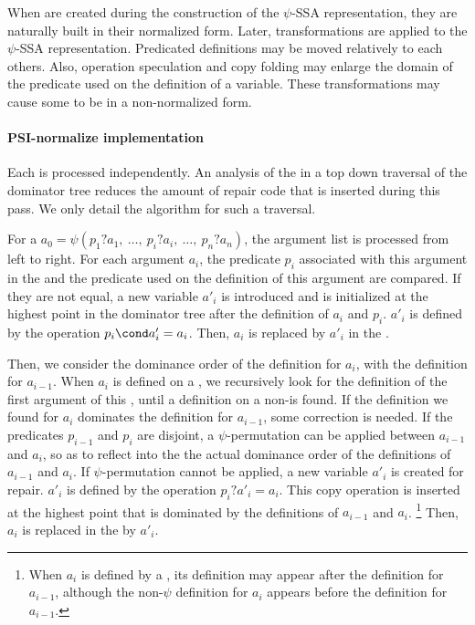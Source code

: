 When \psifuns
are created during the construction of the $\psi$-SSA representation,
they are naturally built in their normalized form. Later, 
transformations are applied to the $\psi$-SSA representation.
Predicated definitions may be moved relatively to each others. Also,
operation speculation and copy folding may enlarge the domain of the
predicate used on the definition of a variable. These transformations
may cause some \psifuns to be in a non-normalized form.




\paragraph{PSI-normalize implementation}

Each \psifun is processed independently. An analysis of the
\psifuns in a top down traversal of the dominator tree
reduces the amount of repair code that is inserted during this pass. We
only detail the algorithm for such a traversal.

For a \psifun ${a_0 = \psi(p_1?a_1,\ \dots,\ p_i?a_i,\ \dots,\
  p_n?a_n)}$, the argument list is processed from left to right. For
each argument ${a_i}$, the predicate ${p_i}$ associated with this argument
in the \psifun and the predicate used on the definition of
this argument are compared. If they are not equal, a new variable
${a'_i}$ is introduced and is initialized at the highest point in the
dominator tree after the definition of ${a_i}$ and ${p_i}$. ${a'_i}$ is
defined by the operation ${p_i\cond a'_i = a_i}$. Then, ${a_i}$ is
replaced by ${a'_i}$ in the \psifun.

Then, we consider the dominance order of the definition for ${a_i}$,
with the definition for ${a_{i-1}}$. When ${a_i}$ is defined on a
\psifun, we recursively look for the definition of the first
argument of this \psifun, until a definition on a non-\psifun is found. 
If the definition we found for ${a_i}$
dominates the definition for ${a_{i-1}}$, some correction is needed.
%
If the predicates ${p_{i-1}}$ and ${p_i}$ are disjoint, a
$\psi$-permutation can be applied between ${a_{i-1}}$ and
${a_i}$, so as to reflect into the \psifun the actual
dominance order of the definitions of ${a_{i-1}}$ and ${a_i}$.
%
If $\psi$-permutation cannot be applied, a new variable ${a'_i}$
is created for repair. ${a'_i}$ is defined by the operation
${p_i? a'_i = a_i}$. This copy operation is inserted at the highest
point that is dominated by the definitions of ${a_{i-1}}$ and
${a_i}$.
\footnote{When ${a_i}$ is defined by a \psifun, its
  definition may appear after the definition for ${a_{i-1}}$,
  although the non-$\psi$ definition for ${a_i}$ appears before
  the definition for ${a_{i-1}}$.}
Then, ${a_i}$ is replaced in the \psifun by ${a'_i}$.

